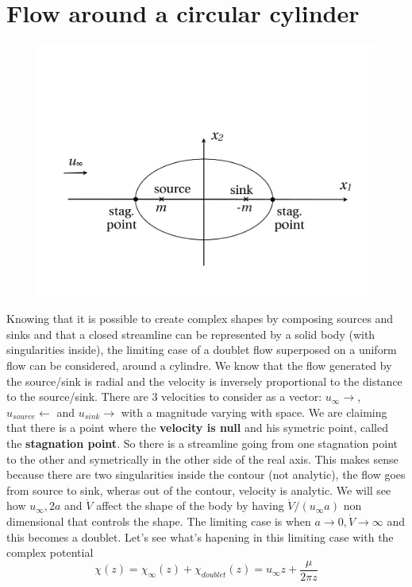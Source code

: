 \section{Flow around a circular cylinder}
	\begin{figure}
	\vspace{-5mm}	
	\includegraphics[scale=0.18]{ch3/9}	
	\label{fig:3.8}
	\end{figure}
	Knowing that it is possible to create complex shapes by composing sources and sinks and  that a closed streamline can be represented by a solid body (with singularities inside), the limiting case of a doublet flow superposed on a uniform flow can be considered, around a cylindre. We know that the flow generated by the source/sink is radial and the velocity is inversely proportional to the distance to the source/sink. There are 3 velocities to consider as a vector: $u_\infty \rightarrow$, $u_{source}\leftarrow$ and $u_{sink}\rightarrow$ with a magnitude varying with space. We are claiming that there is a point where the \textbf{velocity is null} and his symetric point, called the \textbf{stagnation point}. So there is a streamline going from one stagnation point to the other and symetrically in the other side of the real axis. This makes sense because there are two singularities inside the contour (not analytic), the flow goes from source to sink, wheras out of the contour, velocity is analytic. We will see how $u_\infty , 2a$ and $\dot{V}$ affect the shape of the body by having $\dot{V}/(u_\infty a)$ non dimensional that controls the shape. The limiting case is when $a \rightarrow 0, \dot{V} \rightarrow \infty$ and this becomes a doublet. Let's see what's hapening in this limiting case with the complex potential
	\begin{equation}
		\chi (z) = \chi _\infty(z) + \chi _{doublet}(z) = u_\infty z + \frac{\mu}{2\pi z}
		\label{eq:3.48}
	\end{equation}

